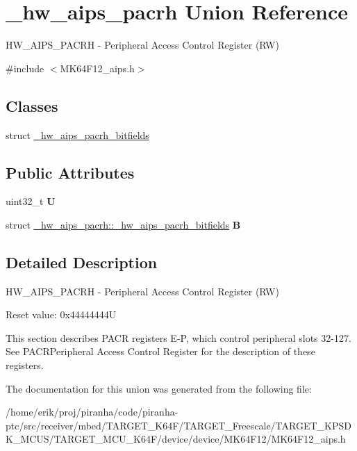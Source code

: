 \hypertarget{union__hw__aips__pacrh}{}\section{\+\_\+hw\+\_\+aips\+\_\+pacrh Union Reference}
\label{union__hw__aips__pacrh}


H\+W\+\_\+\+A\+I\+P\+S\+\_\+\+P\+A\+C\+RH -\/ Peripheral Access Control Register (RW)  




{\ttfamily \#include $<$M\+K64\+F12\+\_\+aips.\+h$>$}

\subsection*{Classes}
\begin{DoxyCompactItemize}
\item 
struct \hyperlink{struct__hw__aips__pacrh_1_1__hw__aips__pacrh__bitfields}{\+\_\+hw\+\_\+aips\+\_\+pacrh\+\_\+bitfields}
\end{DoxyCompactItemize}
\subsection*{Public Attributes}
\begin{DoxyCompactItemize}
\item 
uint32\+\_\+t {\bfseries U}\hypertarget{union__hw__aips__pacrh_a3810454dc438553a97b4840673864861}{}\label{union__hw__aips__pacrh_a3810454dc438553a97b4840673864861}

\item 
struct \hyperlink{struct__hw__aips__pacrh_1_1__hw__aips__pacrh__bitfields}{\+\_\+hw\+\_\+aips\+\_\+pacrh\+::\+\_\+hw\+\_\+aips\+\_\+pacrh\+\_\+bitfields} {\bfseries B}\hypertarget{union__hw__aips__pacrh_a5d897550c609e79d06b04a4608ee0587}{}\label{union__hw__aips__pacrh_a5d897550c609e79d06b04a4608ee0587}

\end{DoxyCompactItemize}


\subsection{Detailed Description}
H\+W\+\_\+\+A\+I\+P\+S\+\_\+\+P\+A\+C\+RH -\/ Peripheral Access Control Register (RW) 

Reset value\+: 0x44444444U

This section describes P\+A\+CR registers E-\/P, which control peripheral slots 32-\/127. See P\+A\+C\+R\+Peripheral Access Control Register for the description of these registers. 

The documentation for this union was generated from the following file\+:\begin{DoxyCompactItemize}
\item 
/home/erik/proj/piranha/code/piranha-\/ptc/src/receiver/mbed/\+T\+A\+R\+G\+E\+T\+\_\+\+K64\+F/\+T\+A\+R\+G\+E\+T\+\_\+\+Freescale/\+T\+A\+R\+G\+E\+T\+\_\+\+K\+P\+S\+D\+K\+\_\+\+M\+C\+U\+S/\+T\+A\+R\+G\+E\+T\+\_\+\+M\+C\+U\+\_\+\+K64\+F/device/device/\+M\+K64\+F12/M\+K64\+F12\+\_\+aips.\+h\end{DoxyCompactItemize}
